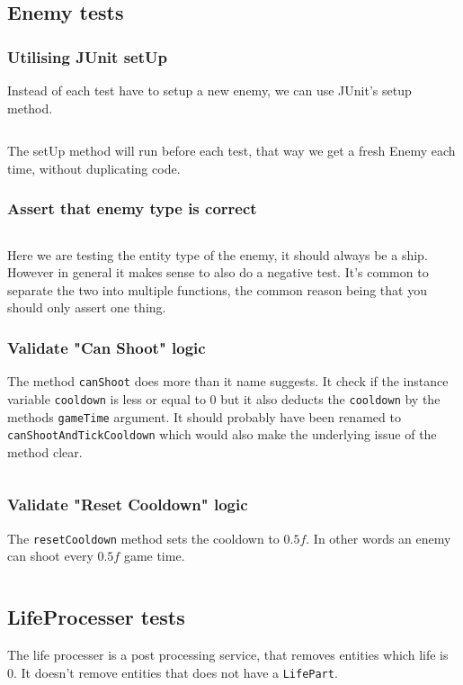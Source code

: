 \subsection{Enemy tests}
\subsubsection{Utilising JUnit setUp}
Instead of each test have to setup a new enemy, we can use JUnit's setup
method.
\inputminted{java}{code/test_lab/enemy/setup.java}
The setUp method will run before each test, that way we get a fresh Enemy each
time, without duplicating code.


\subsubsection{Assert that enemy type is correct}
\inputminted{java}{code/test_lab/enemy/entity_type.java}
Here we are testing the entity type of the enemy, it should always be a ship.
However in general it makes sense to also do a negative test.
It's common to separate the two into multiple functions, the common reason being that you should only
assert one thing.

\subsubsection{Validate "Can Shoot" logic}
%
The method \texttt{canShoot} does more than it name suggests. It check if the
instance variable \texttt{cooldown} is less or equal to $0$ but it also deducts
the \texttt{cooldown} by the methods \texttt{gameTime} argument. It should
probably have been renamed to \texttt{canShootAndTickCooldown} which would also
make the underlying issue of the method clear.

\inputminted{java}{code/test_lab/enemy/can_shoot.java}

\subsubsection{Validate "Reset Cooldown" logic}
The \texttt{resetCooldown} method sets the cooldown to $0.5f$. In other words an enemy can shoot every $0.5f$ game time.

\inputminted{java}{code/test_lab/enemy/reset_cooldown.java}

\subsection{LifeProcesser tests}
The life processer is a post processing service, that removes entities which
life is 0. It doesn't remove entities that does not have a \texttt{LifePart}.
\inputminted{java}{code/test_lab/life_processer.java}
